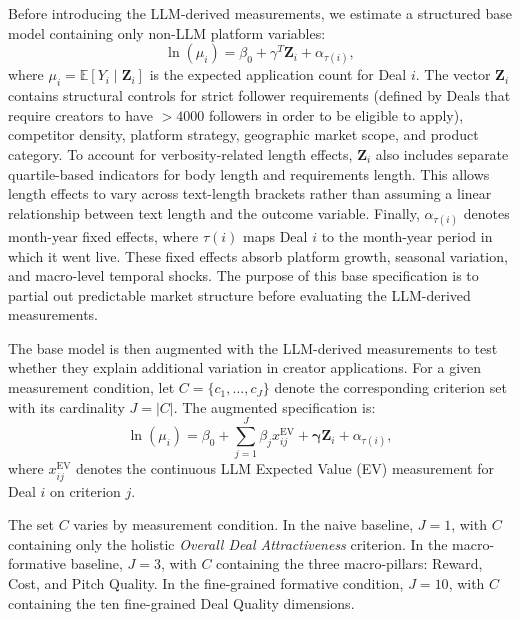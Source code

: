 Before introducing the LLM-derived measurements, we estimate a structured base model containing only non-LLM platform variables:
\begin{equation}\label{eq:barter_base_regression}
    \ln(\mu_i) = \beta_0 + \gamma^T \mathbf{Z}_i + \alpha_{\tau(i)},
\end{equation}
where $\mu_i = \mathbb{E}[Y_i \mid \mathbf{Z}_i]$ is the expected application count for Deal $i$. The vector $\mathbf{Z}_i$ contains structural controls for strict follower requirements (defined by Deals that require creators to have $>4000$ followers in order to be eligible to apply), competitor density, platform strategy, geographic market scope, and product category. To account for verbosity-related length effects, $\mathbf{Z}_i$ also includes separate quartile-based indicators for body length and requirements length. This allows length effects to vary across text-length brackets rather than assuming a linear relationship between text length and the outcome variable. Finally, $\alpha_{\tau(i)}$ denotes month-year fixed effects, where $\tau(i)$ maps Deal $i$ to the month-year period in which it went live. These fixed effects absorb platform growth, seasonal variation, and macro-level temporal shocks. The purpose of this base specification is to partial out predictable market structure before evaluating the LLM-derived measurements.

The base model is then augmented with the LLM-derived measurements to test whether they explain additional variation in creator applications. For a given measurement condition, let $C = \{c_1, \ldots, c_J\}$ denote the corresponding criterion set with its cardinality $J = |C|$. The augmented specification is:
\begin{equation}\label{eq:barter_augmented_regression}
    \ln(\mu_i) = \beta_0 + \sum_{j=1}^{J} \beta_j x^{\text{EV}}_{ij} + \boldsymbol{\gamma} \mathbf{Z}_i + \alpha_{\tau(i)},
\end{equation}
where $x^{\text{EV}}_{ij}$ denotes the continuous LLM Expected Value (EV) measurement for Deal $i$ on criterion $j$.

The set $C$ varies by measurement condition. In the naive baseline, $J=1$, with $C$ containing only the holistic \textit{Overall Deal Attractiveness} criterion. In the macro-formative baseline, $J=3$, with $C$ containing the three macro-pillars: Reward, Cost, and Pitch Quality. In the fine-grained formative condition, $J=10$, with $C$ containing the ten fine-grained Deal Quality dimensions. 

